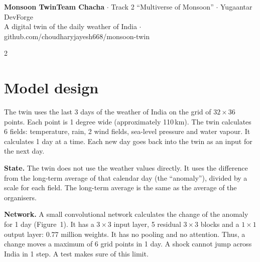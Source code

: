 \documentclass[10pt]{article}
\begin{document}
{\LARGE\bfseries Monsoon Twin}\hfill{\small\color{muted}\textbf{Team Chacha} $\cdot$ Track 2 ``Multiverse of Monsoon'' $\cdot$ Yugaantar DevForge}\\[2pt]
{\small A digital twin of the daily weather of India $\cdot$ github.com/choudharyjayesh668/monsoon-twin}
\vspace{2pt}{\color{line}\hrule}\vspace{4pt}

\begin{multicols}{2}

\section{Model design}
The twin uses the last 3 days of the weather of India on the grid of $32\times36$ points. Each point is 1 degree wide
(approximately 110\,km). The twin calculates 6 fields: temperature, rain, 2 wind fields, sea-level pressure and water
vapour. It calculates 1 day at a time. Each new day goes back into the twin as an input for the next day.

\textbf{State.} The twin does not use the weather values directly. It uses the difference from the long-term average
of that calendar day (the ``anomaly''), divided by a scale for each field. The long-term average is the same as the
average of the organisers.

\textbf{Network.} A small convolutional network calculates the change of the anomaly for 1 day
(Figure~1). It has a $3\times3$ input layer, 5 residual $3\times3$ blocks and a $1\times1$ output layer: 0.77 million
weights. It has no pooling and no attention. Thus, a change moves a maximum of 6 grid points in 1 day.
A shock cannot jump across India in 1 step. A test makes sure of this limit.


\end{multicols}
\end{document}

